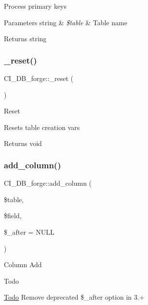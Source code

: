 Process primary keys


\begin{DoxyParams}[1]{Parameters}
string & {\em \$table} & Table name \\
\hline
\end{DoxyParams}
\begin{DoxyReturn}{Returns}
string 
\end{DoxyReturn}
\mbox{\label{class_c_i___d_b__forge_a49fb054fd609b123b260d90ac9d0c011}} 
\subsubsection{\texorpdfstring{\+\_\+reset()}{\_reset()}}
{\footnotesize\ttfamily C\+I\+\_\+\+D\+B\+\_\+forge\+::\+\_\+reset (\begin{DoxyParamCaption}{ }\end{DoxyParamCaption})\hspace{0.3cm}{\ttfamily [protected]}}

Reset

Resets table creation vars

\begin{DoxyReturn}{Returns}
void 
\end{DoxyReturn}
\mbox{\label{class_c_i___d_b__forge_ab1e66284ed82eb6ee154194d14bdd18c}} 
\subsubsection{\texorpdfstring{add\+\_\+column()}{add\_column()}}
{\footnotesize\ttfamily C\+I\+\_\+\+D\+B\+\_\+forge\+::add\+\_\+column (\begin{DoxyParamCaption}\item[{}]{\$table,  }\item[{}]{\$field,  }\item[{}]{\$\+\_\+after = {\ttfamily NULL} }\end{DoxyParamCaption})}

Column Add

\begin{DoxyRefDesc}{Todo}
\item[\mbox{\hyperlink{todo__todo000003}{Todo}}]Remove deprecated \$\+\_\+after option in 3.+ \end{DoxyRefDesc}

